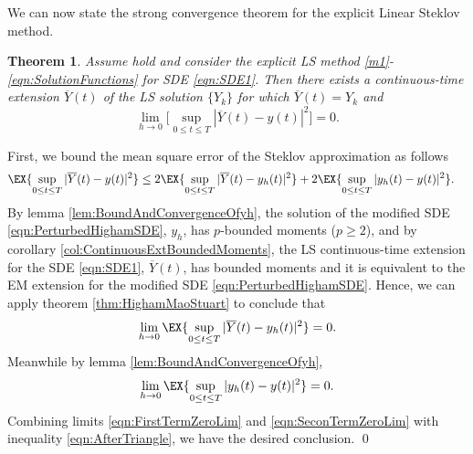 \documentclass[sort&compress, preprint]{elsarticle}
\theoremstyle{definition}
\theoremstyle{plain}%
\newtheorem{thm}{Theorem}[section]
\theoremstyle{remark}
\newcommand{\SM}{LS\xspace}
\begin{document}
	We can now state  the strong convergence theorem  for the  explicit Linear Steklov method.%
\begin{thm}
	Assume  hold and consider the 
	explicit \SM method \eqref{m1}-\eqref{eqn:SolutionFunctions} for SDE \eqref{eqn:SDE1}.
	Then there exists a continuous-time extension $\overline{Y}(t)$ of the LS solution
	 $\{Y_k\}$ for which $\overline{Y}(t)=Y_k$ and
	\begin{equation*}
		\lim_{h\rightarrow0}\Big[\sup_{0\leq t\leq T} |\overline{Y}(t) - y(t)|^2\Big]=0.
	\end{equation*}
\end{thm}
\begin{pf}
	First, we bound  the mean square error of the Steklov approximation as follows
	\begin{align}\label{eqn:AfterTriangle}
		\EX{\sup_{0\leq t \leq T}|\overline{Y}(t) - y(t)|^2}
		&\leq
		2\EX{
			\sup_{0\leq t \leq T}
			|\overline{Y}(t) - y_h(t)|^2
		}
		+
		2\EX{
			\sup_{0\leq t \leq T}
			|y_h(t) - y(t)|^2
		}.
	\end{align}
	 By lemma \ref{lem:BoundAndConvergenceOfyh}, the solution of the modified SDE \eqref{eqn:PerturbedHighamSDE}, $y_h$, has
	$p$-bounded moments ($p\geq 2$), and by corollary \ref{col:ContinuousExtBoundedMoments}, 
	the \SM continuous-time extension for the SDE \eqref{eqn:SDE1}, $\overline{Y}(t)$, 
	has bounded moments and it is equivalent to the EM extension for the modified SDE 
	\eqref{eqn:PerturbedHighamSDE}. Hence, we can apply 
	theorem	\ref{thm:HighamMaoStuart} to conclude that
	\begin{equation}\label{eqn:FirstTermZeroLim}
		\lim_{h\to 0}
		\EX{
			\sup_{0\leq t \leq T}
			|\overline{Y}(t) - y_h(t)|^2
		} = 0.
	\end{equation}
	 Meanwhile by lemma \ref{lem:BoundAndConvergenceOfyh},
	\begin{equation}\label{eqn:SeconTermZeroLim}
		\lim_{h\to 0}
		\EX{
			\sup_{0\leq t \leq T}
			|y_h(t) - y(t)|^2
		} = 0.
	\end{equation}
	Combining limits \eqref{eqn:FirstTermZeroLim} and \eqref{eqn:SeconTermZeroLim} with 
	inequality \eqref{eqn:AfterTriangle}, we have the desired conclusion. \qed
\end{pf}
%
\end{document}
